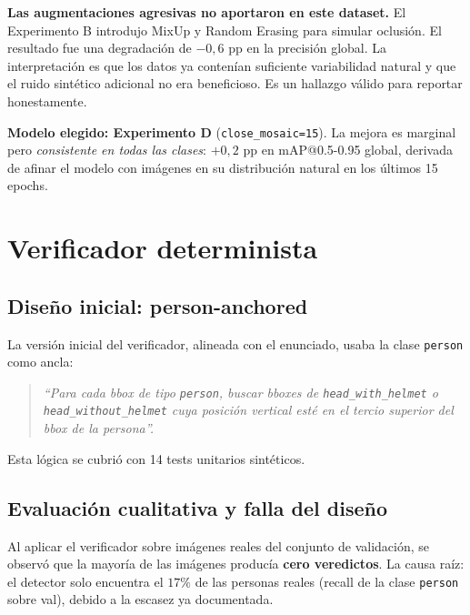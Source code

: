 \documentclass[11pt,a4paper]{article}
\begin{document}
\begin{hallazgo}
\textbf{Las augmentaciones agresivas no aportaron en este dataset.} El
Experimento B introdujo MixUp y Random Erasing para simular oclusión.
El resultado fue una degradación de $-0{,}6$ pp en la precisión
global. La interpretación es que los datos ya contenían suficiente
variabilidad natural y que el ruido sintético adicional no era
beneficioso. Es un hallazgo válido para reportar honestamente.
\end{hallazgo}

\begin{decision}
\textbf{Modelo elegido: Experimento D} (\texttt{close\_mosaic=15}). La
mejora es marginal pero \emph{consistente en todas las clases}: $+0{,}2$
pp en mAP@0.5-0.95 global, derivada de afinar el modelo con imágenes en
su distribución natural en los últimos 15 epochs.
\end{decision}

\section{Verificador determinista}

\subsection{Diseño inicial: person-anchored}

La versión inicial del verificador, alineada con el enunciado, usaba
la clase \texttt{person} como ancla:

\begin{quotation}
\textit{``Para cada bbox de tipo \texttt{person}, buscar bboxes de
\texttt{head\_with\_helmet} o \texttt{head\_without\_helmet} cuya
posición vertical esté en el tercio superior del bbox de la persona''.}
\end{quotation}

Esta lógica se cubrió con 14 tests unitarios sintéticos.

\subsection{Evaluación cualitativa y falla del diseño}

Al aplicar el verificador sobre imágenes reales del conjunto de
validación, se observó que la mayoría de las imágenes producía
\textbf{cero veredictos}. La causa raíz: el detector solo encuentra el
$17\%$ de las personas reales (recall de la clase \texttt{person} sobre
val), debido a la escasez ya documentada.
\end{document}

